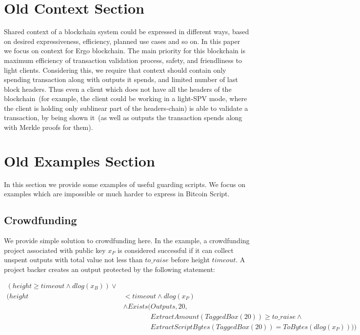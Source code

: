 \documentclass[11pt]{article}
\newcommand{\authnote}[2]{\marginpar{\parbox{\marginparwidth}{\tiny %
  \textsf{#1 {\textcolor{blue}{notes: #2}}}}}%
  \textcolor{blue}{\textbf{\dag}}}
\newcommand{\authnote}[2]{
  \textsf{#1 \textcolor{blue}{: #2}}}
\newcommand{\authnote}[2]{}
\newcommand{\knote}[1]{{\authnote{\textcolor{green}{kushti notes}}{#1}}}
\begin{document}
\section{Old Context Section}

Shared context of a blockchain system could be expressed in different ways, based on desired expressiveness, efficiency, planned use cases and so on. In this paper we focus on context for Ergo blockchain. The main priority for this blockchain is maximum efficiency of transaction validation process, safety, and friendliness to light clients. Considering this, we require that context should contain only spending transaction along with outputs it spends, and limited number of last block headers. Thus even a client which does not have all the headers of the blockchain~(for example, the client could be working in a light-SPV mode, where the client is holding only sublinear part of the headers-chain) is able to validate a transaction, by being shown it~(as well as outputs the transaction spends along with Merkle proofs for them).

\knote{brief context description, link to an appendix with details}




\section{Old Examples Section}

In this section we provide some examples of useful guarding scripts. We focus on examples which are impossible or much harder to express in Bitcoin Script.

\subsection{Crowdfunding}
\label{sec:crowdfunding}

We provide simple solution to crowdfunding here. In the example, a crowdfunding project associated with public key $x_P$ is considered successful if it can collect unspent outputs with total value not less than $to\_raise$ before height $timeout$. A project backer creates an output protected by the following statement: 

\begin{equation*}
\begin{split}
(height \ge timeout \land dlog(x_B)) \lor \\
(height & < timeout \land dlog(x_P)\\
& \land Exists(Outputs, 20,\\ 
& \quad \quad \quad \quad ExtractAmount(TaggedBox(20)) \ge to\_raise \land \\ 
& \quad \quad \quad \quad ExtractScriptBytes(TaggedBox(20)) = ToBytes(dlog(x_P))))
\end{split}
\end{equation*}
\end{document}
